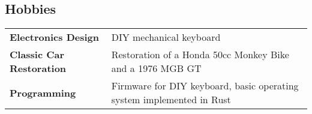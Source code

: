\documentclass[a4paper, oneside, final]{scrartcl} %
\begin{document}
\begin{center}

\section{Hobbies}

\begin{tabularx}{0.9\linewidth}{>{\raggedright\bfseries\arraybackslash}b{4.2cm} >{\raggedright\arraybackslash}X }
Electronics Design & DIY mechanical keyboard\\
Classic Car Restoration & Restoration of a Honda 50cc Monkey Bike and a 1976 MGB GT\\
Programming & Firmware for DIY keyboard, basic operating system implemented in Rust
\end{tabularx}


\end{center}
\end{document}
